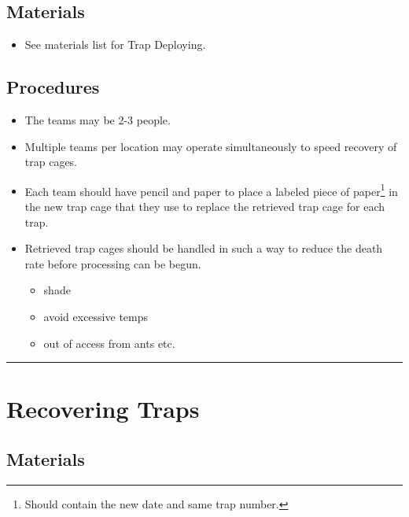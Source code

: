 \documentclass[letterpaper]{scrreprt}
\begin{document}
\section{Materials}\label{materials-2}

\begin{itemize}
\itemsep1pt\parskip0pt
\item
  See materials list for Trap Deploying.
\end{itemize}

\section{Procedures}\label{procedures-2}

\begin{itemize}
\itemsep1pt\parskip0pt
\item
  The teams may be 2-3 people.
\item
  Multiple teams per location may operate simultaneously to speed
  recovery of trap cages.
\item
  Each team should have pencil and paper to place a labeled piece of
  paper\footnote{Should contain the new date and same trap number.} in
  the new trap cage that they use to replace the retrieved trap cage for
  each trap.
\item
  Retrieved trap cages should be handled in such a way to reduce the
  death rate before processing can be begun.

  \begin{itemize}
  \itemsep1pt\parskip0pt
  \item
    shade
  \item
    avoid excessive temps
  \item
    out of access from ants etc.
  \end{itemize}
\end{itemize}

\begin{center}\rule{0.5\linewidth}{\linethickness}\end{center}

\chapter{Recovering Traps}\label{recovering-traps}

\section{Materials}\label{materials-3}
\end{document}

